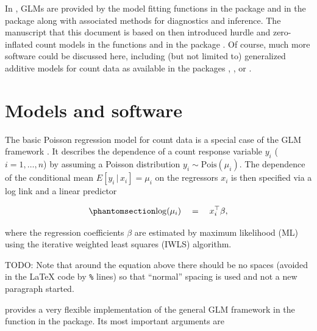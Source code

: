\documentclass[
  nojss,
  article]{jss}
\newcommand{\fct}[1]{\code{#1()}}
\begin{document}
In  \citet{R}, GLMs are provided by the model fitting
functions \fct{glm} in the  package and \fct{glm.nb} in the
 package \citep{VenablesRipley2002} along with associated
methods for diagnostics and inference. The manuscript that this document
is based on \citep{ZeileisKleiberJackman2008} then introduced hurdle and
zero-inflated count models in the functions \fct{hurdle} and
\fct{zeroinfl} in the  package \citet{Jackman2015}. Of course,
much more software could be discussed here, including (but not limited
to) generalized additive models for count data as available in the
 packages  \citet{Wood2006}, 
\citet{StasinopoulosRigby2007}, or  \citet{Yee2009}.

\section{Models and software}\label{sec-models}

The basic Poisson regression model for count data is a special case of
the GLM framework \citet{McCullaghNelder1989}. It describes the
dependence of a count response variable \(y_i\) (\(i = 1, \dots, n\)) by
assuming a Poisson distribution \(y_i \sim \mathrm{Pois}(\mu_i)\). The
dependence of the conditional mean \(E[y_i \, | \, x_i] = \mu_i\) on the
regressors \(x_i\) is then specified via a log link and a linear
predictor

\begin{equation}\phantomsection\label{eq-mean}{
\log(\mu_i) \quad = \quad x_i^\top \beta,
}\end{equation}

where the regression coefficients \(\beta\) are estimated by maximum
likelihood (ML) using the iterative weighted least squares (IWLS)
algorithm.

\begin{tcolorbox}[enhanced jigsaw, colframe=quarto-callout-color-frame, colback=white, rightrule=.15mm, toprule=.15mm, breakable, arc=.35mm, bottomrule=.15mm, leftrule=.75mm, left=2mm, opacityback=0]

TODO: Note that around the equation above there should be no spaces
(avoided in the {\LaTeX} code by \texttt{\%} lines) so that ``normal''
spacing is used and not a new paragraph started.

\end{tcolorbox}

 provides a very flexible implementation of the general GLM
framework in the function \fct{glm} \citet{ChambersHastie1992} in the
 package. Its most important arguments are
\end{document}

